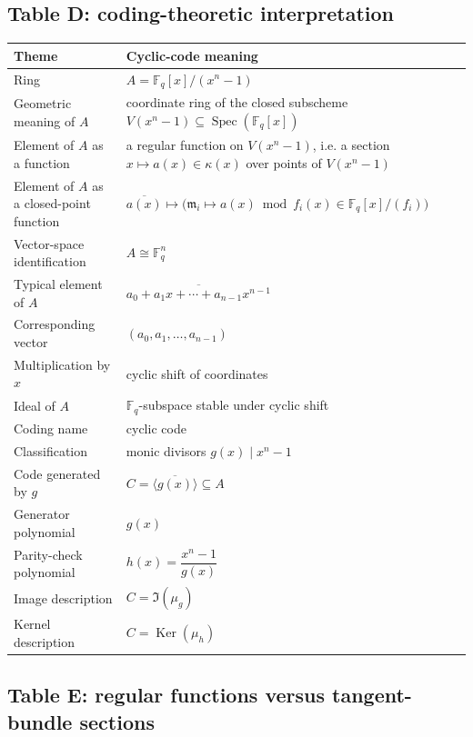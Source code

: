 \documentclass[11pt]{article}
\theoremstyle{definition}
\newcommand{\F}{\mathbb{F}}
\newcommand{\Spec}{\operatorname{Spec}}
\newcommand{\Ker}{\operatorname{Ker}}
\newcommand{\kk}[1]{\kappa\!\left(#1\right)}
\newcommand{\ideal}[1]{\langle #1\rangle}
\newcommand{\ol}[1]{\overline{#1}}
\begin{document}
	\subsection*{Table D: coding-theoretic interpretation}
	
	\begin{longtable}{@{}p{}p{}@{}}
		\toprule
		\textbf{Theme} & \textbf{Cyclic-code meaning} \\ \midrule
		Ring & \(A=\F_q[x]/(x^n-1)\) \\
		Geometric meaning of \(A\) & coordinate ring of the closed subscheme \(V(x^n-1)\subseteq \Spec(\F_q[x])\) \\
		Element of \(A\) as a function & a regular function on \(V(x^n-1)\), i.e. a section \(x\mapsto a(x)\in \kk{x}\) over points of \(V(x^n-1)\) \\
		Element of \(A\) as a closed-point function & \(\ol{a(x)}\mapsto \bigl(\mathfrak m_i\mapsto a(x)\bmod f_i(x)\in \F_q[x]/(f_i)\bigr)\) \\
		Vector-space identification & \(A\cong \F_q^n\) \\
		Typical element of \(A\) & \(\ol{a_0+a_1x+\cdots+a_{n-1}x^{n-1}}\) \\
		Corresponding vector & \((a_0,a_1,\dots,a_{n-1})\) \\
		Multiplication by \(x\) & cyclic shift of coordinates \\
		Ideal of \(A\) & \(\F_q\)-subspace stable under cyclic shift \\
		Coding name & cyclic code \\
		Classification & monic divisors \(g(x)\mid x^n-1\) \\
		Code generated by \(g\) & \(C=\ideal{\ol{g(x)}}\subseteq A\) \\
		Generator polynomial & \(g(x)\) \\
		Parity-check polynomial & \(h(x)=\dfrac{x^n-1}{g(x)}\) \\
		Image description & \(C=\Im(\mu_g)\) \\
		Kernel description & \(C=\Ker(\mu_h)\) \\
		\bottomrule
	\end{longtable}
	
	\subsection*{Table E: regular functions versus tangent-bundle sections}
	
\end{document}
